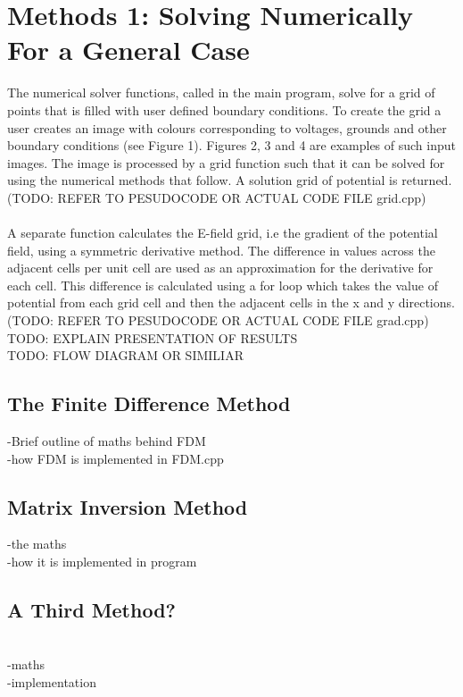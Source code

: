 \documentclass{article}
\begin{document}
\section{Methods 1: Solving Numerically For a General Case}
 The numerical solver functions, called in the main program, solve for a grid of points that is filled with user defined boundary conditions. To create the grid a user creates an image with colours corresponding to voltages, grounds and other boundary conditions (see Figure 1). Figures 2, 3 and 4 are examples of such input images. The image is processed by a grid function such that it can be solved for using the numerical methods that follow. A solution grid of potential is returned. \\
(TODO: REFER TO PESUDOCODE OR ACTUAL CODE FILE grid.cpp) \\ 
\\
A separate function calculates the E-field grid, i.e the gradient of the potential field, using a symmetric derivative method. The difference in values across the adjacent cells per unit cell are used as an approximation for the derivative for each cell. This difference is calculated using a for loop which takes the value of potential from each grid cell and then the adjacent cells in the x and y directions.
\\
(TODO: REFER TO PESUDOCODE OR ACTUAL CODE FILE grad.cpp) \\
TODO: EXPLAIN PRESENTATION OF RESULTS \\
TODO: FLOW DIAGRAM OR SIMILIAR \\



\subsection{The Finite Difference Method}
-Brief outline of maths behind FDM \\ 
-how FDM is implemented in FDM.cpp \\

\subsection{Matrix Inversion Method}
-the maths \\
-how it is implemented in program \\

\subsection{A Third Method?} \\
-maths \\
-implementation \\
\end{document}
